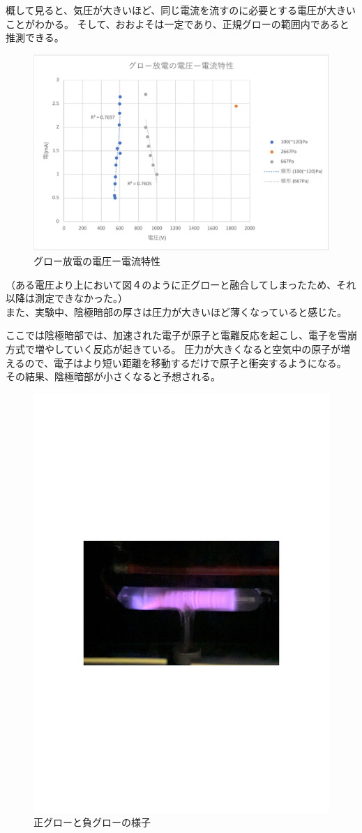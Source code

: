 \documentclass[a4j,twocolumn]{jsarticle}
\begin{document}
概して見ると、気圧が大きいほど、同じ電流を流すのに必要とする電圧が大きいことがわかる。
そして、おおよそは一定であり、正規グローの範囲内であると推測できる。

\begin{figure}[htb]
    \centering
    \includegraphics[keepaspectratio,width=0.8\columnwidth]{fig/glow.pdf}
    \caption{グロー放電の電圧ー電流特性}
\end{figure}




（ある電圧より上において図４のように正グローと融合してしまったため、それ以降は測定できなかった。）\\

また、実験中、陰極暗部の厚さは圧力が大きいほど薄くなっていると感じた。

ここでは陰極暗部では、加速された電子が原子と電離反応を起こし、電子を雪崩方式で増やしていく反応が起きている。
圧力が大きくなると空気中の原子が増えるので、電子はより短い距離を移動するだけで原子と衝突するようになる。
その結果、陰極暗部が小さくなると予想される。

\begin{figure}[htb]
    \centering
    \includegraphics[keepaspectratio,width=0.6\columnwidth]{fig/fusion.pdf}
    \caption{正グローと負グローの様子}
\end{figure}
\end{document}
